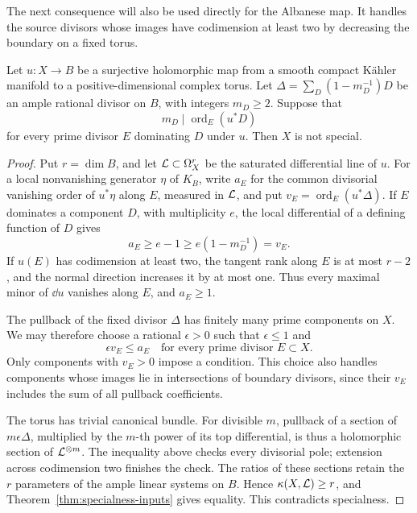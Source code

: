 The next consequence will also be used directly for the Albanese map.
It handles the source divisors whose images have codimension at least
two by decreasing the boundary on a fixed torus.

\begin{lemma}
\label{de:small-boundary}
Let \(u:X\to B\) be a surjective holomorphic map from a smooth
compact K\"ahler manifold to a positive-dimensional complex torus.
Let
\(\Delta=\sum_D(1-m_D^{-1})D\) be an ample rational divisor on
\(B\), with integers \(m_D\ge2\). Suppose that
\[
 m_D\mid\operatorname{ord}_E(u^*D)
\]
for every prime divisor \(E\) dominating \(D\) under \(u\).
Then \(X\) is not special.
\end{lemma}

\begin{proof}
Put \(r=\dim B\), and let \(\mathcal L\subset\Omega_X^r\) be the
saturated differential line of \(u\). For a local nonvanishing
generator \(\eta\) of \(K_B\), write \(a_E\) for the common
divisorial vanishing order of \(u^*\eta\) along \(E\), measured
in \(\mathcal L\), and put \(v_E=\operatorname{ord}_E(u^*\Delta)\).
If \(E\) dominates a component \(D\), with multiplicity \(e\),
the local differential of a defining function of \(D\) gives
\[
 a_E\ge e-1\ge e(1-m_D^{-1})=v_E.
\]
If \(u(E)\) has codimension at least two, the tangent rank along
\(E\) is at most \(r-2\), and the normal direction increases
it by at most one. Thus every maximal minor of \(\dd u\)
vanishes along \(E\), and \(a_E\ge1\).

The pullback of the fixed divisor \(\Delta\) has finitely many
prime components on \(X\). We may therefore choose a rational
\(\epsilon>0\) such that \(\epsilon\le1\) and
\[
 \epsilon v_E\le a_E
 \quad\text{for every prime divisor }E\subset X.
\]
Only components with \(v_E>0\) impose a condition. This choice also
handles components whose images lie in intersections of boundary
divisors, since their \(v_E\) includes the sum of all pullback
coefficients.

The torus has trivial canonical bundle. For divisible \(m\), pullback
of a section of \(m\epsilon\Delta\), multiplied by the \(m\)-th
power of its top differential, is thus a holomorphic section of
\(\mathcal L^{\otimes m}\). The inequality above checks every divisorial
pole; extension across codimension two finishes the check. The ratios
of these sections retain the \(r\) parameters of the ample linear
systems on \(B\). Hence \(\kappa(X,\mathcal L)\ge r\), and
Theorem~\ref{thm:specialness-inputs} gives equality. This contradicts
specialness.
\end{proof}

